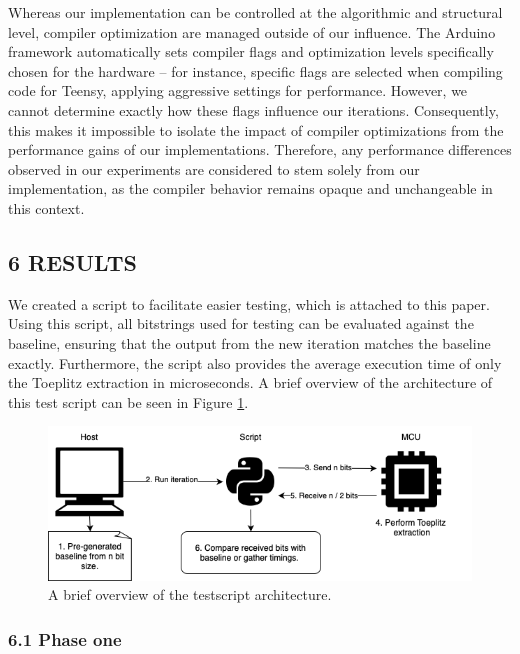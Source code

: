 \documentclass{sigchi}
\begin{document}
Whereas our implementation can be controlled at the algorithmic and structural level, compiler optimization are managed outside of our influence. The Arduino framework automatically sets compiler flags and optimization levels specifically chosen for the hardware -- for instance, specific flags are selected when compiling code for Teensy, applying aggressive settings for performance. However, we cannot determine exactly how these flags influence our iterations. Consequently, this makes it impossible to isolate the impact of compiler optimizations from the performance gains of our implementations. Therefore, any performance differences observed in our experiments are considered to stem solely from our implementation, as the compiler behavior remains opaque and unchangeable in this context.

\subsection{6 RESULTS}\label{results}

We created a script to facilitate easier testing, which is attached to this paper. Using this script, all bitstrings used for testing can be evaluated against the baseline, ensuring that the output from the new iteration matches the baseline exactly. Furthermore, the script also provides the average execution time of only the Toeplitz extraction in microseconds. A brief overview of the architecture of this test script can be seen in Figure \ref{fig:testscript-architecture}.

\begin{figure}[!t] \centering
\includegraphics[width=\textwidth]{img/testscript.png} \caption{A brief overview
of the testscript architecture.} \label{fig:testscript-architecture}
\end{figure}

\subsubsection{6.1 Phase one}\label{phase-one-1}
\end{document}
